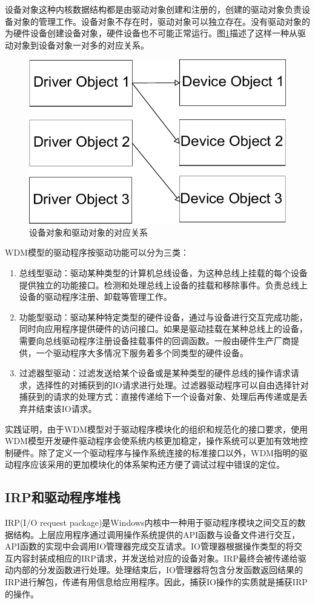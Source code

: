 设备对象这种内核数据结构都是由驱动对象创建和注册的，创建的驱动对象负责设备对象的管理工作。设备对象不存在时，驱动对象可以独立存在。没有驱动对象的为硬件设备创建设备对象，硬件设备也不可能正常运行。图\ref{fig:drv-to-dev}描述了这样一种从驱动对象到设备对象一对多的对应关系。
\begin{figure}[H]
\centering
\includegraphics[width=0.6\linewidth]{./graph/drv-to-dev}
\caption{设备对象和驱动对象的对应关系}
\label{fig:drv-to-dev}
\end{figure}

WDM模型的驱动程序按驱动功能可以分为三类：
\begin{enumerate}
\item
总线型驱动：驱动某种类型的计算机总线设备，为这种总线上挂载的每个设备提供独立的功能接口。检测和处理总线上设备的挂载和移除事件。负责总线上设备的驱动程序注册、卸载等管理工作。
\item
功能型驱动：驱动某种特定类型的硬件设备，通过与设备进行交互完成功能，同时向应用程序提供硬件的访问接口。如果是驱动挂载在某种总线上的设备，需要向总线驱动程序注册设备挂载事件的回调函数。一般由硬件生产厂商提供，一个驱动程序大多情况下服务着多个同类型的硬件设备。
\item
过滤器型驱动：过滤发送给某个设备或是某种类型的硬件总线的操作请求请求，选择性的对捕获到的IO请求进行处理。过滤器驱动程序可以自由选择针对捕获到的请求的处理方式：直接传递给下一个设备对象、处理后再传递或是丢弃并结束该IO请求。
\end{enumerate}

实践证明，由于WDM模型对于驱动程序模块化的组织和规范化的接口要求，使用WDM模型开发硬件驱动程序会使系统内核更加稳定，操作系统可以更加有效地控制硬件。除了定义一个驱动程序与操作系统连接的标准接口以外，WDM指明的驱动程序应该采用的更加模块化的体系架构还方便了调试过程中错误的定位。

\subsection{IRP和驱动程序堆栈}
IRP(I/O request package)是Windows内核中一种用于驱动程序模块之间交互的数据结构。上层应用程序通过调用操作系统提供的API函数与设备文件进行交互，API函数的实现中会调用IO管理器完成交互请求。IO管理器根据操作类型的将交互内容封装成相应的IRP请求，并发送给对应的设备对象。IRP最终会被传递给驱动内部的分发函数进行处理。处理结束后，IO管理器将包含分发函数返回结果的IRP进行解包，传递有用信息给应用程序。因此，捕获IO操作的实质就是捕获IRP的操作。

